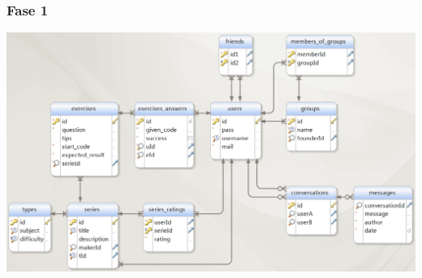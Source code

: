 \subsubsection{Fase 1}
\mbox{\hspace{-6ex}\includegraphics[keepaspectratio=true, scale=0.4]{raport_files/design/UML1.png}}
